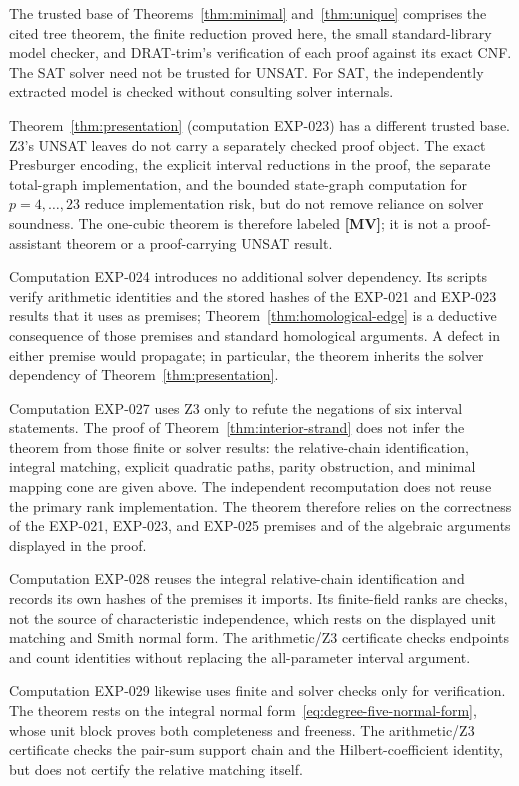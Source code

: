 \documentclass[11pt]{article}
\theoremstyle{definition}
\theoremstyle{remark}
\begin{document}
The trusted base of Theorems~\ref{thm:minimal} and~\ref{thm:unique} comprises the cited tree
theorem, the finite reduction proved here, the small standard-library model checker, and
DRAT-trim's verification of each proof against its exact CNF. The SAT solver need not be trusted
for UNSAT. For SAT, the independently extracted model is checked without consulting solver
internals.

Theorem~\ref{thm:presentation} (computation EXP-023) has a different trusted base. Z3's UNSAT
leaves do not carry a separately checked proof object. The exact Presburger encoding, the explicit
interval reductions in the proof, the separate total-graph implementation, and the bounded
state-graph computation for $p=4,\ldots,23$ reduce implementation risk, but do not remove reliance
on solver soundness. The one-cubic theorem is therefore labeled \textbf{[MV]}; it is not a
proof-assistant theorem or a proof-carrying UNSAT result.

Computation EXP-024 introduces no additional solver dependency. Its scripts verify arithmetic
identities and the stored hashes of the EXP-021 and EXP-023 results that it uses as premises;
Theorem~\ref{thm:homological-edge} is a deductive consequence of those premises and standard
homological arguments. A defect in either premise would propagate; in particular, the theorem
inherits the solver dependency of Theorem~\ref{thm:presentation}.

Computation EXP-027 uses Z3 only to refute the negations of six interval statements. The proof of
Theorem~\ref{thm:interior-strand} does not infer the theorem from those finite or solver results:
the relative-chain identification, integral matching, explicit quadratic paths, parity
obstruction, and minimal mapping cone are given above. The independent recomputation does not
reuse the primary rank implementation. The theorem therefore relies on the correctness of the
EXP-021, EXP-023, and EXP-025 premises and of the algebraic arguments displayed in the proof.

Computation EXP-028 reuses the integral relative-chain identification and records its own hashes
of the premises it imports. Its finite-field ranks are checks, not the source of characteristic
independence, which rests on the displayed unit matching and Smith normal form. The arithmetic/Z3
certificate checks endpoints and count identities without replacing the all-parameter interval
argument.

Computation EXP-029 likewise uses finite and solver checks only for verification. The theorem
rests on the integral normal form~\eqref{eq:degree-five-normal-form}, whose unit block proves both
completeness and freeness. The arithmetic/Z3 certificate checks the pair-sum support chain and the
Hilbert-coefficient identity, but does not certify the relative matching itself.
\end{document}
